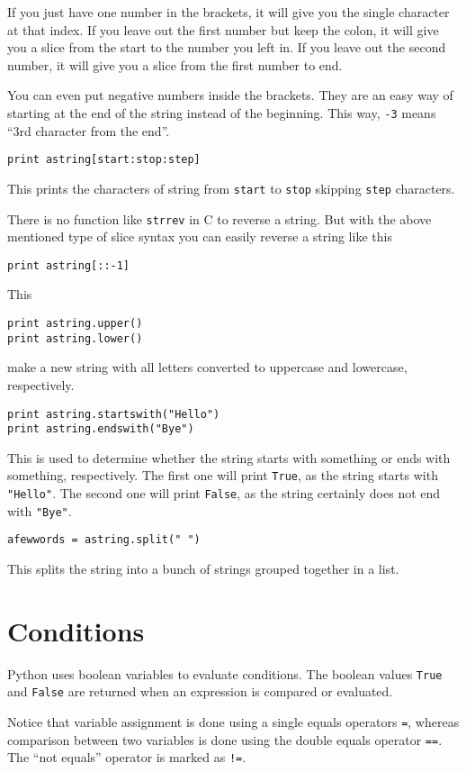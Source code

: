 \documentclass[a4paper,oneside]{book}
\numberwithin{equation}{chapter}
\begin{document}
If you just have one number in the brackets, it will give you the single character at that index. If you leave out the first number but keep the colon, it will give you a slice from the start to the number you left in. If you leave out the second number, it will give you a slice from the first number to end.

You can even put negative numbers inside the brackets. They are an easy way of starting at the end of the string instead of the beginning. This way, \verb|-3| means ``3rd character from the end''.
\begin{verbatim}
print astring[start:stop:step]
\end{verbatim}
This prints the characters of string from \texttt{start} to \texttt{stop} skipping \texttt{step} characters.

There is no function like \texttt{strrev} in C to reverse a string. But with the above mentioned type of slice syntax you can easily reverse a string like this
\begin{verbatim}
print astring[::-1]
\end{verbatim}
This
\begin{verbatim}
print astring.upper()
print astring.lower()
\end{verbatim}
make a new string with all letters converted to uppercase and lowercase, respectively.
\begin{verbatim}
print astring.startswith("Hello")
print astring.endswith("Bye")
\end{verbatim}
This is used to determine whether the string starts with something or ends with something, respectively. The first one will print \texttt{True}, as the string starts with \verb|"Hello"|. The second one will print \texttt{False}, as the string certainly does not end with \verb|"Bye"|.
\begin{verbatim}
afewwords = astring.split(" ")
\end{verbatim}
This splits the string into a bunch of strings grouped together in a list.
\section{Conditions}
Python uses boolean variables to evaluate conditions. The boolean values \texttt{True} and \texttt{False} are returned when an expression is compared or evaluated. 

Notice that variable assignment is done using a single equals operators \verb|=|, whereas comparison between two variables is done using the double equals operator \verb|==|. The ``not equals'' operator is marked as \verb|!=|.
\end{document}
